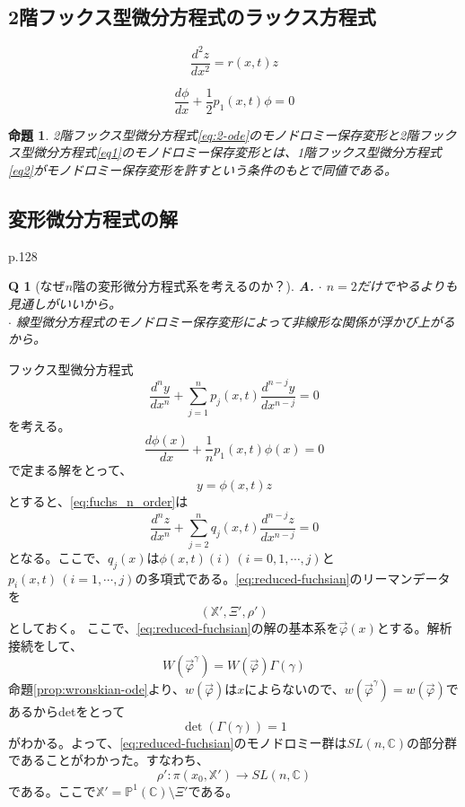 \documentclass[paper=a4, fontsize=11pt]{jlreq} %
\theoremstyle{break}
\newtheorem{proposition}[theorem]{命題}
\theoremstyle{qa}
\newtheorem*{Q}{Q}
\theoremstyle{remark} %
\begin{document}
\subsection{2階フックス型微分方程式のラックス方程式}

\begin{equation}\label{eq1}
\frac{d^{2}z}{dx^{2}}=r(x,t)z
\end{equation}

\begin{equation}\label{eq2}
\frac{d\phi}{dx}+\frac{1}{2}p_{1}(x,t)\phi=0
\end{equation}

\begin{proposition}
    2階フックス型微分方程式\eqref{eq:2-ode}のモノドロミー保存変形と2階フックス型微分方程式\eqref{eq1}のモノドロミー保存変形とは、1階フックス型微分方程式\eqref{eq2}がモノドロミー保存変形を許すという条件のもとで同値である。
\end{proposition}

\subsection{変形微分方程式の解}

p.128
\begin{Q}[なぜ$n$階の変形微分方程式系を考えるのか？]
\textbf{A.} $\cdot$ $n=2$だけでやるよりも見通しがいいから。\\
$\cdot$ 線型微分方程式のモノドロミー保存変形によって非線形な関係が浮かび上がるから。
\end{Q}

フックス型微分方程式
\begin{equation}\label{eq:linear-ode-n}
    \frac{d^{n}y}{dx^{n}}+\sum_{j=1}^{n} p_{j}(x,t)\frac{d^{n-j}y}{dx^{n-j}} = 0   
\end{equation}
を考える。\\
\begin{equation}\label{eq:auxiliary-phi}
\frac{d\phi(x)}{dx}+\frac{1}{n}p_{1}(x,t)\phi(x)=0
\end{equation}
で定まる解をとって、
\[
y=\phi(x,t)z
\]
とすると、\eqref{eq:fuchs_n_order}は
\begin{equation}\label{eq:reduced-fuchsian}
\frac{d^{n}z}{dx^{n}}+\sum_{j=2}^{n} q_{j}(x,t)\frac{d^{n-j}z}{dx^{n-j}} = 0
\end{equation}
となる。ここで、$q_{j}(x)$は$\phi(x,t)(i)\,(i=0,1,\cdots,j)$と$p_{i}(x,t)\,(i=1,\cdots,j)$の多項式である。\eqref{eq:reduced-fuchsian}のリーマンデータを
\[
(\mathbb{X}',\Xi',\rho')
\]
としておく。
ここで、\eqref{eq:reduced-fuchsian}の解の基本系を$\vec{\varphi}(x)$とする。解析接続をして、
\[
W(\vec{\varphi}^{\gamma})=W(\vec{\varphi})\Gamma(\gamma)
\]
命題\ref{prop:wronskian-ode}より、$w(\vec{\varphi})$は$x$によらないので、$w(\vec{\varphi}^{\gamma})=w(\vec{\varphi})$であるからdetをとって
\[
\det(\Gamma(\gamma))=1
\]
がわかる。よって、\eqref{eq:reduced-fuchsian}のモノドロミー群は$SL(n,\mathbb{C})$の部分群であることがわかった。すなわち、
\[
\rho':\pi(x_{0},\mathbb{X}')\to SL(n,\mathbb{C})
\]
である。ここで$\mathbb{X}'=\mathbb{P}^{1}(\mathbb{C})\setminus \Xi'$である。
\end{document}

